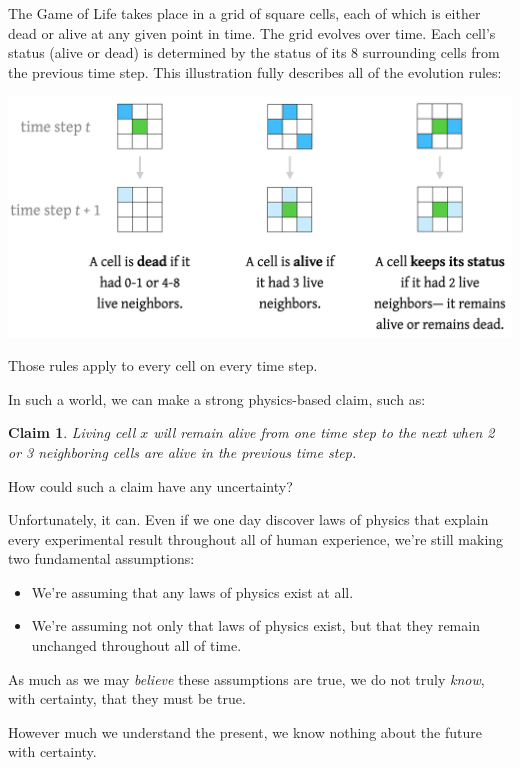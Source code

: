 \documentclass[9pt, twoside]{book}
\newtheorem*{claim}{Claim}
\theoremstyle{argtstyle}
\begin{document}
The Game of Life takes place in a grid of square cells, each of which is either
dead or alive at any given point in time. The grid evolves over
time. Each cell's status (alive or dead) is determined by the status of its 8
surrounding cells from the previous time step. This illustration fully
describes all of the evolution rules:
\begin{center}
\includegraphics[width=\textwidth]{gameoflife2.png}
\end{center}
Those rules apply to every cell on every time step.

In such a world, we can make a strong physics-based claim, such as:
\begin{claim}
    Living cell $x$ will remain alive from one time step to the next when 2 or 3
    neighboring cells are alive in the previous time step.
\end{claim}

How could such a claim have any uncertainty?

Unfortunately, it can. Even if we one day discover laws of physics that
explain every experimental result throughout all of human
experience, we're still making two fundamental assumptions:
\begin{itemize}
    \item We're assuming that any laws of physics exist at all.
    \item We're assuming not only that laws of physics exist, but that they
        remain unchanged throughout all of time.
\end{itemize}
As much as we may {\em believe} these assumptions are true, we do not truly {\em
know}, with certainty, that they must be true.

However much we understand the present, we know nothing about
the future with certainty.
\end{document}
